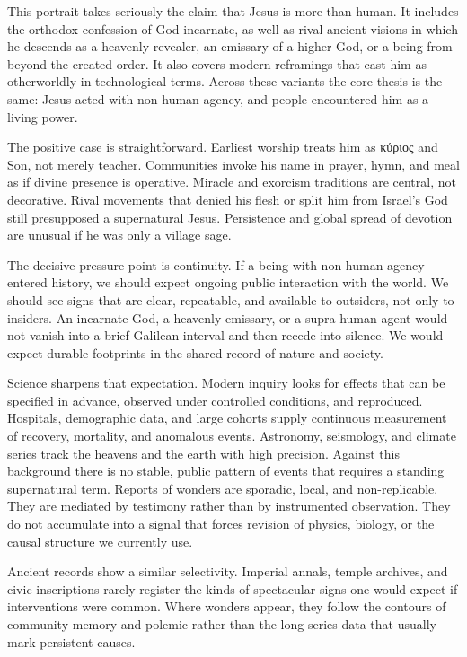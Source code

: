 This portrait takes seriously the claim that Jesus is more than human.
It includes the orthodox confession of God incarnate, as well as rival ancient visions in which he descends as a heavenly revealer, an emissary of a higher God, or a being from beyond the created order.
It also covers modern reframings that cast him as otherworldly in technological terms.
Across these variants the core thesis is the same: Jesus acted with non-human agency, and people encountered him as a living power.

The positive case is straightforward.
Earliest worship treats him as κύριος and Son, not merely teacher.
Communities invoke his name in prayer, hymn, and meal as if divine presence is operative.
Miracle and exorcism traditions are central, not decorative.
Rival movements that denied his flesh or split him from Israel’s God still presupposed a supernatural Jesus.
Persistence and global spread of devotion are unusual if he was only a village sage.

The decisive pressure point is continuity.
If a being with non-human agency entered history, we should expect ongoing public interaction with the world.
We should see signs that are clear, repeatable, and available to outsiders, not only to insiders.
An incarnate God, a heavenly emissary, or a supra-human agent would not vanish into a brief Galilean interval and then recede into silence.
We would expect durable footprints in the shared record of nature and society.

Science sharpens that expectation.
Modern inquiry looks for effects that can be specified in advance, observed under controlled conditions, and reproduced.
Hospitals, demographic data, and large cohorts supply continuous measurement of recovery, mortality, and anomalous events.
Astronomy, seismology, and climate series track the heavens and the earth with high precision.
Against this background there is no stable, public pattern of events that requires a standing supernatural term.
Reports of wonders are sporadic, local, and non-replicable.
They are mediated by testimony rather than by instrumented observation.
They do not accumulate into a signal that forces revision of physics, biology, or the causal structure we currently use.

Ancient records show a similar selectivity.
Imperial annals, temple archives, and civic inscriptions rarely register the kinds of spectacular signs one would expect if interventions were common.
Where wonders appear, they follow the contours of community memory and polemic rather than the long series data that usually mark persistent causes.

